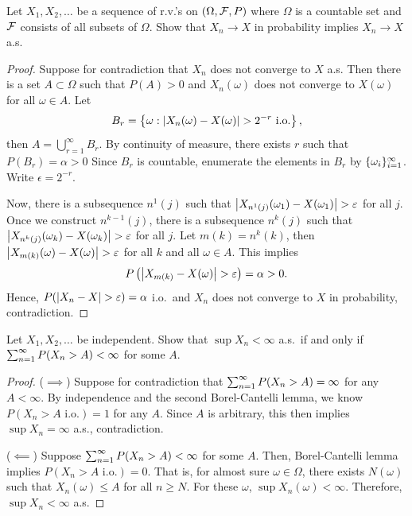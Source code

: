 \documentclass[a4paper]{article}
\begin{document}
\begin{ex}[Durrett 2.3.12]
  Let $X_1, X_2, \dots$ be a sequence of r.v.'s on $(\Omega, \mathcal{F}, P)$ 
  where $\Omega$ is a countable set and $\mathcal{F}$ consists of all subsets 
  of $\Omega$. Show that $X_n \to X$ in probability implies 
  $X_n \to X$ a.s.
\end{ex}

\begin{proof}
  Suppose for contradiction that $X_n$ does not converge to $X$ a.s. 
  Then there is a set $A \subset \Omega$ such that $P(A) > 0$ and 
  $X_n (\omega)$ does not converge to $X(\omega)$ for all $\omega \in A$.
  Let
  \[
  B_r = \left\{ \omega : \left\lvert X_n (\omega) - X (\omega)\right\rvert
  > 2^{-r} \text{ i.o.} \right\},
  \]
  then $A = \bigcup_{r=1}^\infty B_r$. By continuity of measure, 
  there exists $r$ such that $P (B_r) = \alpha > 0$
  Since $B_r$ is countable, enumerate the elements in $B_r$ by 
  $\{ \omega_i \}_{i=1}^\infty$. Write $\epsilon = 2^{-r}$.

  Now, there is a subsequence $n^1 (j)$ such that 
  $\left\lvert X_{n^1 (j)} (\omega_1) - X(\omega_1)\right\rvert > \varepsilon$ for all $j$.
  Once we construct $n^{k - 1} (j)$, there is a subsequence $n^{k} (j)$ 
  such that $\left\lvert X_{n^k(j)} (\omega_k) - X (\omega_k)\right\rvert > \varepsilon$
  for all $j$. Let $m(k) = n^k (k)$, then 
  $\left\lvert X_{m(k)} (\omega) - X(\omega)\right\rvert > \varepsilon$ for all $k$ and 
  all $\omega \in A$. This implies 
  \[
  P \left( \left\lvert X_{m(k)} - X(\omega)\right\rvert > \varepsilon \right) 
  = \alpha > 0.
  \]
  Hence, $P (\left\lvert X_n - X\right\rvert > \varepsilon) = \alpha$ i.o.\ and $X_n$ does not 
  converge to $X$ in probability, contradiction.

\end{proof}

\begin{ex}[Durrett 2.3.14]
  Let $X_1, X_2, \dots$ be independent. Show that $\sup X_n < \infty$ a.s.\ 
  if and only if $\sum_{n=1}^\infty P(X_n > A) < \infty$ for some $A$.
\end{ex}

\begin{proof}
  ($\implies$) Suppose for contradiction that 
  $\sum_{n=1}^\infty P(X_n > A) = \infty$ for any $A < \infty$. 
  By independence and the second Borel-Cantelli lemma, 
  we know $P(X_n > A \text{ i.o.}) = 1$ for any $A$. 
  Since $A$ is arbitrary, this then implies $\sup X_n = \infty$ a.s., 
  contradiction.

  ($\impliedby$) Suppose $\sum_{n=1}^\infty P(X_n > A) < \infty$ for some $A$.
  Then, Borel-Cantelli lemma implies $P (X_n > A \text{ i.o.}) = 0$.
  That is, for almost sure $\omega \in \Omega$, there exists 
  $N(\omega)$ such that $X_n(\omega) \leq A$ for all $n \geq N$.
  For these $\omega$, $\sup X_n (\omega) < \infty$. Therefore, 
  $\sup X_n < \infty$ a.s.

\end{proof}
\end{document}
